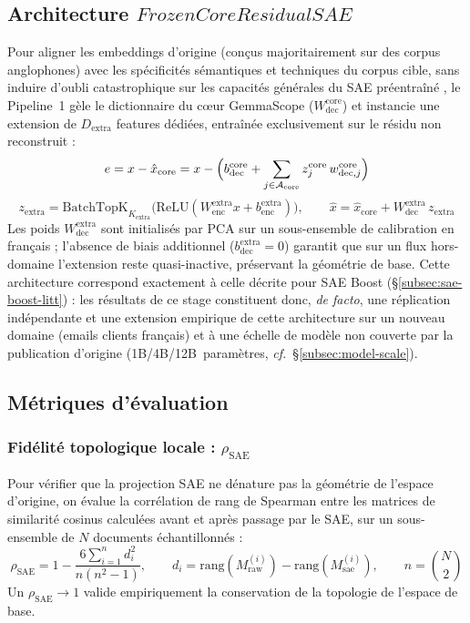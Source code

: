 \documentclass[11pt]{article}
\begin{document}
\subsection{Architecture \texorpdfstring{$\textit{FrozenCoreResidualSAE}$}{FrozenCoreResidualSAE}}
\label{subsec:frozencore}

Pour aligner les embeddings d'origine (conçus majoritairement sur des corpus
anglophones) avec les spécificités sémantiques et techniques du corpus cible,
sans induire d'oubli catastrophique sur les capacités générales du SAE
préentraîné \cite{lieberum2024gemmascope}, le Pipeline~1 gèle le dictionnaire du cœur GemmaScope
($W_\text{dec}^\text{core}$) et instancie une extension de $D_\text{extra}$
features dédiées, entraînée exclusivement sur le résidu non reconstruit :
\[
  e = x - \hat{x}_\text{core} = x - \Bigl(b_\text{dec}^\text{core} +
  \sum_{j \in \mathcal{A}_\text{core}} z_j^\text{core}\, w_{\text{dec},j}^\text{core}\Bigr)
\]
\[
  z_\text{extra} = \text{BatchTopK}_{K_\text{extra}}\bigl(\text{ReLU}(W_\text{enc}^\text{extra} x + b_\text{enc}^\text{extra})\bigr), \qquad
  \hat{x} = \hat{x}_\text{core} + W_\text{dec}^\text{extra}\, z_\text{extra}
\]
Les poids $W_\text{dec}^\text{extra}$ sont initialisés par PCA sur un
sous-ensemble de calibration en français ; l'absence de biais additionnel
($b_\text{dec}^\text{extra}=0$) garantit que sur un flux hors-domaine
l'extension reste quasi-inactive, préservant la géométrie de base. Cette
architecture correspond exactement à celle décrite pour SAE Boost
(\S\ref{subsec:sae-boost-litt}) : les résultats de ce stage constituent donc,
\emph{de facto}, une réplication indépendante et une extension empirique de
cette architecture sur un nouveau domaine (emails clients français) et à une
échelle de modèle non couverte par la publication d'origine
(1B/4B/12B~paramètres, \emph{cf.}~\S\ref{subsec:model-scale}).

\subsection{Métriques d'évaluation}

\subsubsection{Fidélité topologique locale : \texorpdfstring{$\rho_\text{SAE}$}{rho\_SAE}}
Pour vérifier que la projection SAE ne dénature pas la géométrie de l'espace
d'origine, on évalue la corrélation de rang de Spearman entre les matrices de
similarité cosinus calculées avant et après passage par le SAE, sur un
sous-ensemble de $N$ documents échantillonnés :
\[
  \rho_\text{SAE} = 1 - \frac{6\sum_{i=1}^n d_i^2}{n(n^2-1)}, \qquad
  d_i = \text{rang}(M_\text{raw}^{(i)}) - \text{rang}(M_\text{sae}^{(i)}), \qquad
  n = \binom{N}{2}
\]
Un $\rho_\text{SAE} \to 1$ valide empiriquement la conservation de la
topologie de l'espace de base.
\end{document}
